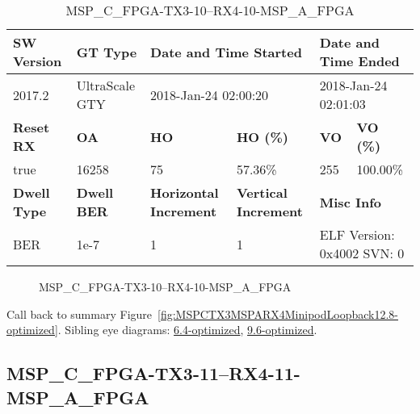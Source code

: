\begin{table}[h]
\centering
\caption{MSP\_C\_FPGA-TX3-10--RX4-10-MSP\_A\_FPGA}
\label{tab:MSPCFPGATX310RX410MSPAFPGA12.8-optimized}
\begin{tabular}{@{}|l|l|l|l|l|l|@{}}
\toprule
\textbf{SW Version}                & \textbf{GT Type}   & \multicolumn{2}{l|}{\textbf{Date and Time Started}}            & \multicolumn{2}{l|}{\textbf{Date and Time Ended}}        \\ \midrule
2017.2                       & UltraScale GTY          & \multicolumn{2}{l|}{2018-Jan-24 02:00:20}                   & \multicolumn{2}{l|}{2018-Jan-24 02:01:03}               \\ \midrule
\textbf{Reset RX}                  & \textbf{OA} & \textbf{HO}   & \textbf{HO (\%)} & \textbf{VO} & \textbf{VO (\%)} \\ \midrule
true & 16258        & 75          & 57.36\%        & 255        & 100.00\%       \\ \midrule
\textbf{Dwell Type}                & \textbf{Dwell BER} & \textbf{Horizontal Increment} & \textbf{Vertical Increment}    & \multicolumn{2}{l|}{\textbf{Misc Info}}                  \\ \midrule
BER                            & 1e-7        & 1        & 1           & \multicolumn{2}{l|}{ELF Version: 0x4002 SVN: 0}                         \\ \bottomrule
\end{tabular}
\end{table}

\begin{figure}[h]
\caption{MSP\_C\_FPGA-TX3-10--RX4-10-MSP\_A\_FPGA} \label{fig:MSPCFPGATX310RX410MSPAFPGA12.8-optimized}
\end{figure}

Call back to summary Figure~\ref{fig:MSPCTX3MSPARX4MinipodLoopback12.8-optimized}.
Sibling eye diagrams: \hyperref[sec:MSPCFPGATX310RX410MSPAFPGA6.4-optimized]{6.4-optimized}, \hyperref[sec:MSPCFPGATX310RX410MSPAFPGA9.6-optimized]{9.6-optimized}.

\clearpage
\newpage


\subsection{MSP\_C\_FPGA-TX3-11--RX4-11-MSP\_A\_FPGA}\label{sec:MSPCFPGATX311RX411MSPAFPGA12.8-optimized}

